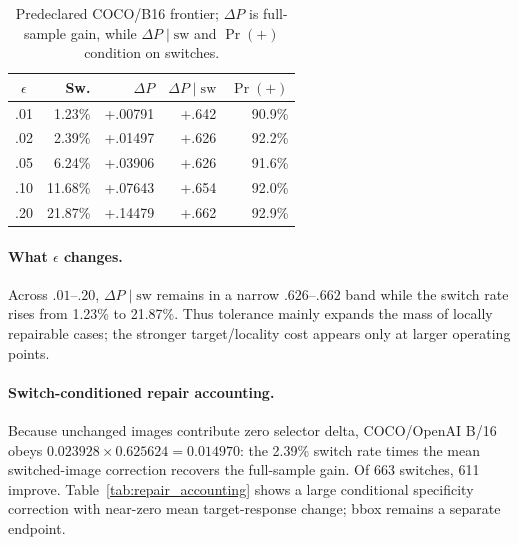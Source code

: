 \documentclass[10pt]{article}
\begin{document}
\begin{table}[!t]
\centering
\caption{Predeclared COCO/B16 frontier; $\Delta P$ is full-sample gain, while $\Delta P\mid\mathrm{sw}$ and $\Pr(+)$ condition on switches.}
\label{tab:frontier}
\small
\setlength{\tabcolsep}{2.0pt}
\renewcommand{\arraystretch}{0.95}
\begin{tabular}{crrrr}
\toprule
$\epsilon$ & Sw. & $\Delta P$ & $\Delta P\mid\mathrm{sw}$ & $\Pr(+)$\\
\midrule
.01 & 1.23\% & +.00791 & +.642 & 90.9\%\\
.02 & 2.39\% & +.01497 & +.626 & 92.2\%\\
.05 & 6.24\% & +.03906 & +.626 & 91.6\%\\
.10 & 11.68\% & +.07643 & +.654 & 92.0\%\\
.20 & 21.87\% & +.14479 & +.662 & 92.9\%\\
\bottomrule
\end{tabular}
\end{table}

\paragraph{What $\epsilon$ changes.}
Across $.01$--$.20$, $\Delta P\mid\mathrm{sw}$ remains in a narrow $.626$--$.662$ band while the switch rate rises from 1.23\% to 21.87\%. Thus tolerance mainly expands the mass of locally repairable cases; the stronger target/locality cost appears only at larger operating points.

\newpage
\paragraph{Switch-conditioned repair accounting.}
Because unchanged images contribute zero selector delta, COCO/OpenAI B/16 obeys
$0.023928\times0.625624=0.014970$: the 2.39\% switch rate times the mean
switched-image correction recovers the full-sample gain. Of 663 switches, 611
improve. Table~\ref{tab:repair_accounting} shows a large conditional specificity
correction with near-zero mean target-response change; bbox remains a separate endpoint.
\end{document}
